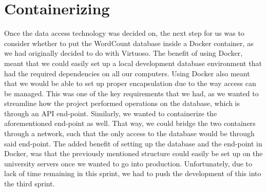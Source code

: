 \section{Containerizing}
Once the data access technology was decided on, the next step for us was to consider whether to put the WordCount database inside a Docker container, as we had originally decided to do with Virtuoso. The benefit of using Docker, meant that we could easily set up a local development database environment that had the required dependencies on all our computers. Using Docker also meant that we would be able to set up proper encapsulation due to the way access can be managed. This was one of the key requirements that we had, as we wanted to streamline how the \knox{} project performed operations on the database, which is through an API end-point. 
Similarly, we wanted to containerize the aforementioned end-point as well. That way, we could bridge the two containers through a network, such that the only access to the database would be through said end-point.
The added benefit of setting up the database and the end-point in Docker, was that the previously mentioned structure could easily be set up on the university servers once we wanted to go into production.
Unfortunately, due to lack of time remaining in this sprint, we had to push the development of this into the third sprint.